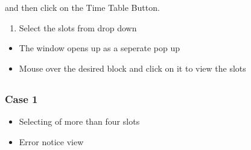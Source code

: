 \documentclass[letterpaper,10pt,english]{sphinxmanual}
\begin{document}
\begin{sphinxVerbatim}[commandchars=\\\{\}]
 
\end{sphinxVerbatim}

and then click on the Time Table Button.
\begin{enumerate}
%
\setcounter{enumi}{1}
\item {} 
Select the slots from drop down

\end{enumerate}
\begin{itemize}
\item {} 
The window opens up as a seperate pop up

\end{itemize}

\begin{itemize}
\item {} 
Mouse over the desired block and click on it to view the slots

\end{itemize}



\subsection{}
\label{\detokenize{user_manual:anamolies-management}}

\subsubsection{Case 1}
\label{\detokenize{user_manual:case-1}}\begin{itemize}
\item {} 
Selecting of more than four slots

\end{itemize}

\begin{itemize}
\item {} 
Error notice view

\end{itemize}
\end{document}
